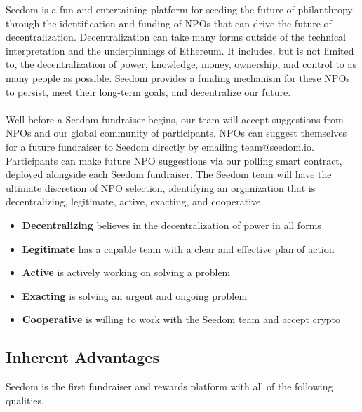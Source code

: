 \documentclass[11pt]{article}
\begin{document}
Seedom is a fun and entertaining platform for seeding the future of philanthropy through the identification and funding of NPOs that can drive the future of decentralization. Decentralization can take many forms outside of the technical interpretation and the underpinnings of Ethereum. It includes, but is not limited to, the decentralization of power, knowledge, money, ownership, and control to as many people as possible. Seedom provides a funding mechanism for these NPOs to persist, meet their long-term goals, and decentralize our future.\\\\
Well before a Seedom fundraiser begins, our team will accept suggestions from NPOs and our global community of participants. NPOs can suggest themselves for a future fundraiser to Seedom directly by emailing team@seedom.io. Participants can make future NPO suggestions via our polling smart contract, deployed alongside each Seedom fundraiser. The Seedom team will have the ultimate discretion of NPO selection, identifying an organization that is decentralizing, legitimate, active, exacting, and cooperative.

\begin{itemize}
\item{\textbf{Decentralizing} believes in the decentralization of power in all forms}
\item{\textbf{Legitimate} has a capable team with a clear and effective plan of action}
\item{\textbf{Active} is actively working on solving a problem}
\item{\textbf{Exacting} is solving an urgent and ongoing problem}
\item{\textbf{Cooperative} is willing to work with the Seedom team and accept crypto}
\end{itemize}

\subsection{Inherent Advantages}

Seedom is the first fundraiser and rewards platform with all of the following qualities.
\end{document}
